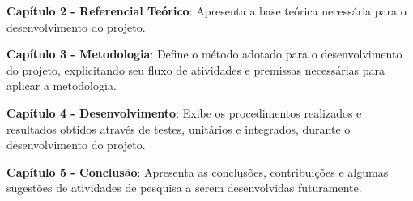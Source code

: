 \textbf{Capítulo 2 - Referencial Teórico}: Apresenta a base teórica necessária para o desenvolvimento do projeto.

\textbf{Capítulo 3 - Metodologia}: Define o método adotado para o desenvolvimento do projeto, explicitando seu fluxo de atividades e premissas necessárias para aplicar a metodologia.

\textbf{Capítulo 4 - Desenvolvimento}: Exibe os procedimentos realizados e resultados obtidos através de testes, unitários e integrados, durante o desenvolvimento do projeto.

\textbf{Capítulo 5 - Conclusão}: Apresenta as conclusões, contribuições e algumas sugestões de atividades de pesquisa a serem desenvolvidas futuramente.
